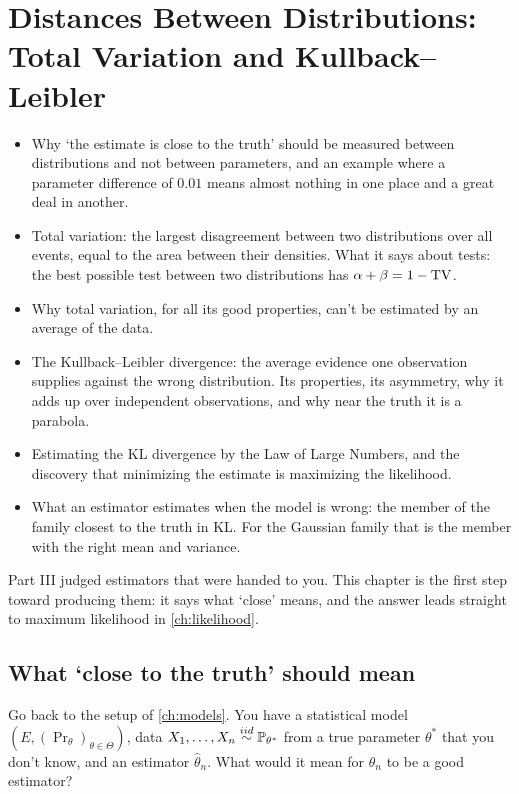 \chapter[Distances Between Distributions]{Distances Between Distributions: Total Variation and Kullback--Leibler}
\label{ch:distances}

\begin{chaptergoals}
\begin{itemize}[nosep]
\item Why `the estimate is close to the truth' should be measured between distributions and not between parameters, and an example where a parameter difference of $0.01$ means almost nothing in one place and a great deal in another.
\item Total variation: the largest disagreement between two distributions over all events, equal to the area between their densities. What it says about tests: the best possible test between two distributions has $\alpha + \beta = 1 - \mathrm{TV}$.
\item Why total variation, for all its good properties, can't be estimated by an average of the data.
\item The Kullback--Leibler divergence: the average evidence one observation supplies against the wrong distribution. Its properties, its asymmetry, why it adds up over independent observations, and why near the truth it is a parabola.
\item Estimating the KL divergence by the Law of Large Numbers, and the discovery that minimizing the estimate is maximizing the likelihood.
\item What an estimator estimates when the model is wrong: the member of the family closest to the truth in KL. For the Gaussian family that is the member with the right mean and variance.
\end{itemize}
Part III judged estimators that were handed to you. This chapter is the first step toward producing them: it says what `close' means, and the answer leads straight to maximum likelihood in \cref{ch:likelihood}.
\end{chaptergoals}

\section{What `close to the truth' should mean}
\label{sec:dist-close}

Go back to the setup of \cref{ch:models}.
You have a statistical model $(E, (\Pr_\theta)_{\theta \in \Theta})$, data $X_1, \ldots, X_n \stackrel{iid}{\sim} \mathbb{P}_{\theta^*}$ from a true parameter $\theta^*$ that you don't know, and an estimator $\hat{\theta}_n$.
What would it mean for $\hat{\theta}_n$ to be a good estimator?

